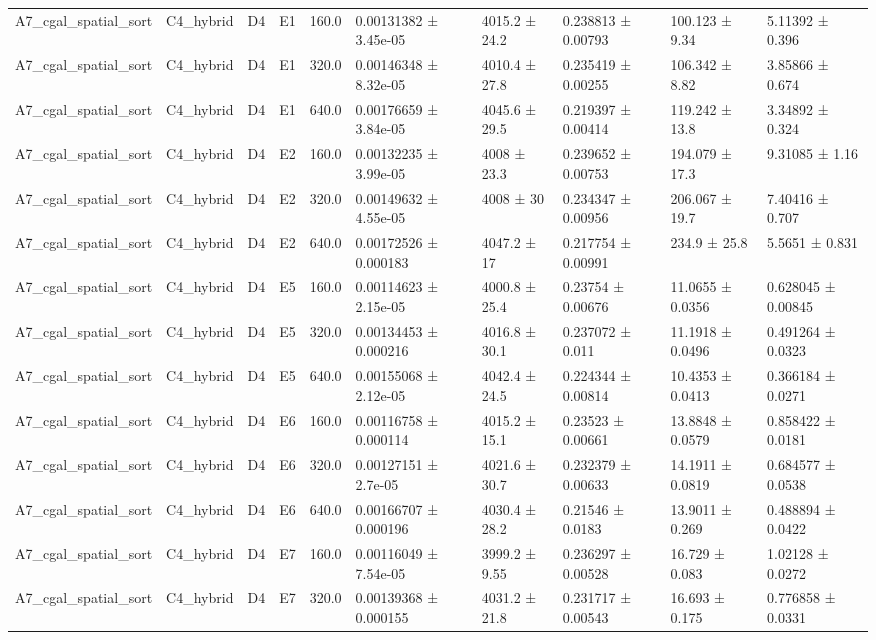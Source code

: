 \begin{table}
\begin{tabular}{llllllllll}
A7\_cgal\_spatial\_sort & C4\_hybrid & D4 & E1 & 160.0 & 0.00131382 ± 3.45e-05 & 4015.2 ± 24.2 & 0.238813 ± 0.00793 & 100.123 ± 9.34 & 5.11392 ± 0.396 \\
A7\_cgal\_spatial\_sort & C4\_hybrid & D4 & E1 & 320.0 & 0.00146348 ± 8.32e-05 & 4010.4 ± 27.8 & 0.235419 ± 0.00255 & 106.342 ± 8.82 & 3.85866 ± 0.674 \\
A7\_cgal\_spatial\_sort & C4\_hybrid & D4 & E1 & 640.0 & 0.00176659 ± 3.84e-05 & 4045.6 ± 29.5 & 0.219397 ± 0.00414 & 119.242 ± 13.8 & 3.34892 ± 0.324 \\
A7\_cgal\_spatial\_sort & C4\_hybrid & D4 & E2 & 160.0 & 0.00132235 ± 3.99e-05 & 4008 ± 23.3 & 0.239652 ± 0.00753 & 194.079 ± 17.3 & 9.31085 ± 1.16 \\
A7\_cgal\_spatial\_sort & C4\_hybrid & D4 & E2 & 320.0 & 0.00149632 ± 4.55e-05 & 4008 ± 30 & 0.234347 ± 0.00956 & 206.067 ± 19.7 & 7.40416 ± 0.707 \\
A7\_cgal\_spatial\_sort & C4\_hybrid & D4 & E2 & 640.0 & 0.00172526 ± 0.000183 & 4047.2 ± 17 & 0.217754 ± 0.00991 & 234.9 ± 25.8 & 5.5651 ± 0.831 \\
A7\_cgal\_spatial\_sort & C4\_hybrid & D4 & E5 & 160.0 & 0.00114623 ± 2.15e-05 & 4000.8 ± 25.4 & 0.23754 ± 0.00676 & 11.0655 ± 0.0356 & 0.628045 ± 0.00845 \\
A7\_cgal\_spatial\_sort & C4\_hybrid & D4 & E5 & 320.0 & 0.00134453 ± 0.000216 & 4016.8 ± 30.1 & 0.237072 ± 0.011 & 11.1918 ± 0.0496 & 0.491264 ± 0.0323 \\
A7\_cgal\_spatial\_sort & C4\_hybrid & D4 & E5 & 640.0 & 0.00155068 ± 2.12e-05 & 4042.4 ± 24.5 & 0.224344 ± 0.00814 & 10.4353 ± 0.0413 & 0.366184 ± 0.0271 \\
A7\_cgal\_spatial\_sort & C4\_hybrid & D4 & E6 & 160.0 & 0.00116758 ± 0.000114 & 4015.2 ± 15.1 & 0.23523 ± 0.00661 & 13.8848 ± 0.0579 & 0.858422 ± 0.0181 \\
A7\_cgal\_spatial\_sort & C4\_hybrid & D4 & E6 & 320.0 & 0.00127151 ± 2.7e-05 & 4021.6 ± 30.7 & 0.232379 ± 0.00633 & 14.1911 ± 0.0819 & 0.684577 ± 0.0538 \\
A7\_cgal\_spatial\_sort & C4\_hybrid & D4 & E6 & 640.0 & 0.00166707 ± 0.000196 & 4030.4 ± 28.2 & 0.21546 ± 0.0183 & 13.9011 ± 0.269 & 0.488894 ± 0.0422 \\
A7\_cgal\_spatial\_sort & C4\_hybrid & D4 & E7 & 160.0 & 0.00116049 ± 7.54e-05 & 3999.2 ± 9.55 & 0.236297 ± 0.00528 & 16.729 ± 0.083 & 1.02128 ± 0.0272 \\
A7\_cgal\_spatial\_sort & C4\_hybrid & D4 & E7 & 320.0 & 0.00139368 ± 0.000155 & 4031.2 ± 21.8 & 0.231717 ± 0.00543 & 16.693 ± 0.175 & 0.776858 ± 0.0331 \\

\end{tabular}
\end{table}
